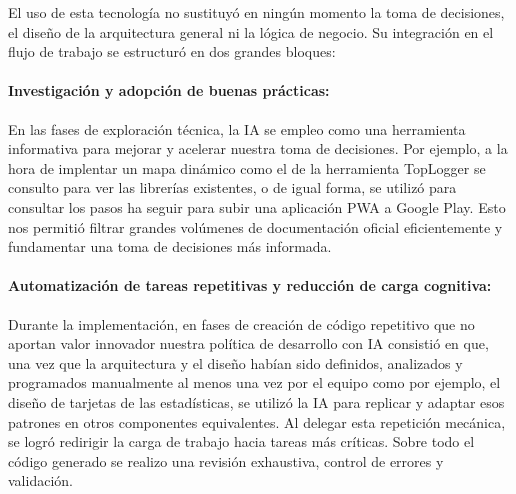 El uso de esta tecnología no sustituyó en ningún momento la toma de decisiones, el diseño de la arquitectura general ni la lógica de negocio. Su integración en el flujo de trabajo se estructuró en dos grandes bloques:

\paragraph{Investigación y adopción de buenas prácticas:} En las fases de exploración técnica, la IA se empleo como una herramienta informativa para mejorar y acelerar nuestra toma de decisiones. Por ejemplo, a la hora de implentar un mapa dinámico como el de la herramienta TopLogger se consulto para ver las librerías existentes, o de igual forma, se utilizó para consultar los pasos ha seguir para subir una aplicación PWA a Google Play. Esto nos permitió filtrar grandes volúmenes de documentación oficial eficientemente y fundamentar una toma de decisiones más informada.

\paragraph{Automatización de tareas repetitivas y reducción de carga cognitiva:} Durante la implementación, en fases de creación de código repetitivo que no aportan valor innovador nuestra política de desarrollo con IA consistió en que, una vez que la arquitectura y el diseño habían sido definidos, analizados y programados manualmente al menos una vez por el equipo como por ejemplo, el diseño de tarjetas de las estadísticas, se utilizó la IA para replicar y adaptar esos patrones en otros componentes equivalentes. Al delegar esta repetición mecánica, se logró redirigir la carga de trabajo hacia tareas más críticas. Sobre todo el código generado se realizo una revisión exhaustiva, control de errores y validación.